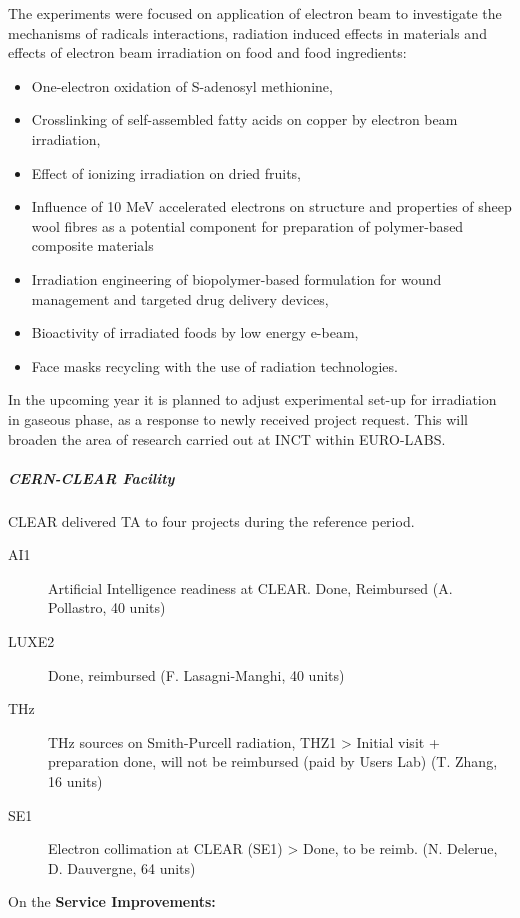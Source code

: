 {The experiments were focused on application of electron beam to investigate the mechanisms of radicals interactions, radiation induced effects in materials and effects of electron beam irradiation on food and food ingredients: 
\begin{itemize}
\item One-electron oxidation of S-adenosyl methionine,
\item Crosslinking of self-assembled fatty acids on copper by electron beam irradiation,
\item Effect of ionizing irradiation on dried fruits,
\item Influence of 10 MeV accelerated electrons on structure and properties of sheep wool fibres as a potential component for preparation of polymer-based composite materials
\item Irradiation engineering of biopolymer-based formulation for wound management and targeted drug delivery devices,
\item Bioactivity of irradiated foods by low energy e-beam,
\item Face masks recycling with the use of radiation technologies.
\end{itemize}
In the upcoming year it is planned to adjust experimental set-up for irradiation in gaseous phase, as a response to newly received project request. This will broaden the area of research carried out at INCT within EURO-LABS.


\subparagraph*{CERN-CLEAR Facility}

CLEAR delivered TA to four projects during the reference period. 
\begin{description}
    \item[AI1] Artificial Intelligence readiness at CLEAR. Done, Reimbursed (A. Pollastro, 40 units)
    \item[LUXE2] Done, reimbursed (F. Lasagni-Manghi, 40 units)
    \item[THz] THz sources on Smith-Purcell radiation, THZ1 > Initial visit + preparation done, 
will not be reimbursed (paid by Users Lab) (T. Zhang, 16 units)
    \item[SE1] Electron collimation at CLEAR (SE1) > Done, to be reimb. (N. Delerue, D. Dauvergne, 64 units)
\end{description}

On the \textbf{Service Improvements:}


}
